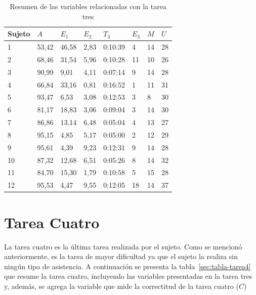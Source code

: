\begin{table}[H]
\centering
\footnotesize
\begin{tabular}{|p{1.6cm}|p{1.6cm}|p{1.6cm}|p{1.6cm}|p{1.6cm}|p{1.6cm}|p{1.6cm}|p{1.6cm}|}
\hline
    Sujeto &  $A$     & $E_1$    & $E_2$   & $T_3$      & $E_3$ & $M$ & $U$ \\
    \hline 
    1      & 53,42  & 46,58  & 2,83 & 0:10:39 & 4  & 14      &  28 \\
    2      & 68,46  & 31,54  & 5,96 & 0:10:28 & 11 & 10      &  26 \\
    3      & 90,99  & 9,01   & 4,11 & 0:07:14 & 9  & 14      &  28 \\
    4      & 66,84  & 33,16  & 0,81 & 0:16:52 & 1  & 11      &  31 \\
    5      & 93,47  & 6,53   & 3,08 & 0:12:53 & 3  & 8       &  30 \\
    6      & 81,17  & 18,83  & 3,06 & 0:09:04 & 3  & 14      &  30 \\
    7      & 86,86  & 13,14  & 6,48 & 0:05:04 & 4  & 13      &  27 \\
    8      & 95,15  & 4,85   & 5,17 & 0:05:00 & 2  & 12      &  29 \\
    9      & 95,61  & 4,39   & 9,23 & 0:12:31 & 9  & 14      &  28 \\
    10     & 87,32  & 12,68  & 6,51 & 0:05:26 & 8  & 14      &  32 \\
    11     & 84,70  & 15,30  & 1,79 & 0:10:58 & 5  & 15      &  28 \\
    12     & 95,53  & 4,47   & 9,55 & 0:12:05 & 18 & 14      &  37 \\
\hline
\end{tabular}
\caption{Resumen de las variables relacionadas con la tarea tres}
\label{sec:tabla-tarea3}
\end{table}

\section{Tarea Cuatro}

La tarea cuatro es la \'ultima tarea realizada por el sujeto. Como se mencion\'o anteriormente, es la tarea
de mayor dificultad ya que el sujeto la realiza sin ning\'un tipo de asistencia. A continuaci\'on se presenta
la tabla~\ref{sec:tabla-tarea4} que resume la tarea cuatro, incluyendo las variables presentadas en la tarea tres y, adem\'as, se
agrega la variable que mide la correctitud de la tarea cuatro ($C$)

